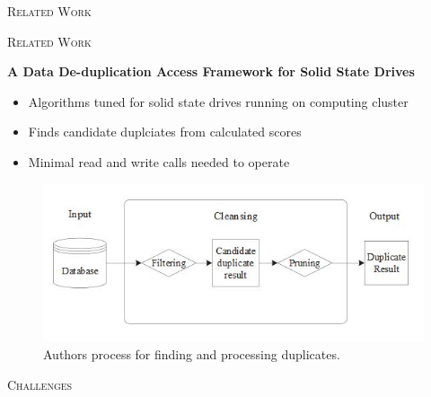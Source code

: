 \documentclass[final,t]{beamer}
\begin{document}
\begin{frame}{}
\begin{columns}[t]
\begin{column}{.325\linewidth}
\begin{block}{\textsc{Related Work}}
\begin{figure}
	  \end{figure}          

	\end{block}
		
	\begin{block}{\textsc{Related Work}}

		\textbf{A Data De-duplication Access Framework for Solid State Drives \cite{a2}}
          \begin{itemize}
          
            \item Algorithms tuned for solid state drives running on computing cluster

            \item Finds candidate duplciates from calculated scores
            
            \item Minimal read and write calls needed to operate
                
          \end{itemize} 
          
          \begin{figure}			
  	    \centering
            \includegraphics[scale=1.4]{duplicate.JPG}
            \vspace*{.05in}
	    \caption{Authors process for finding and processing duplicates.}
            
	  \end{figure}          

	\end{block}
	
        \begin{block}{\textsc{Challenges}}
          \begin{itemize}


\end{itemize}
\end{block}
\end{column}
\end{columns}
\end{frame}
\end{document}
